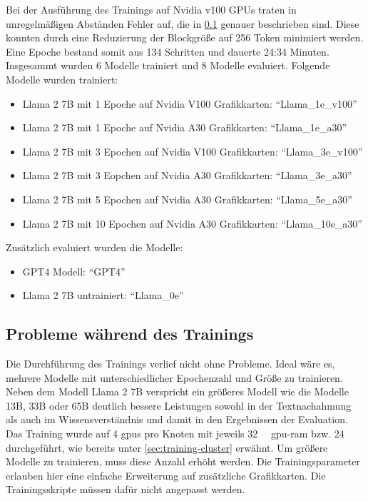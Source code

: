 Bei der Ausführung des Trainings auf Nvidia v100 GPUs traten in unregelmäßigen Abständen Fehler auf, die in \cref{sec:problem-training} genauer beschrieben sind.
Diese konnten durch eine Reduzierung der Blockgröße auf 256 Token minimiert werden. Eine Epoche bestand somit aus 134 Schritten und dauerte 24:34 Minuten.\\

Insgesammt wurden 6 Modelle trainiert und 8 Modelle evaluiert.
Folgende Modelle wurden trainiert:
\begin{itemize}
    \item Llama 2 7B mit 1 Epoche auf Nvidia V100 Grafikkarten: \enquote{Llama\_1e\_v100}
    \item Llama 2 7B mit 1 Epoche auf Nvidia A30 Grafikkarten: \enquote{Llama\_1e\_a30}
    \item Llama 2 7B mit 3 Epochen auf Nvidia V100 Grafikkarten: \enquote{Llama\_3e\_v100}
    \item Llama 2 7B mit 3 Eopchen auf Nvidia A30 Grafikkarten: \enquote{Llama\_3e\_a30}
    \item Llama 2 7B mit 5 Epochen auf Nvidia A30 Grafikkarten: \enquote{Llama\_5e\_a30}
    \item Llama 2 7B mit 10 Epochen auf Nvidia A30 Grafikkarten: \enquote{Llama\_10e\_a30}
\end{itemize}

Zusätzlich evaluiert wurden die Modelle:
\begin{itemize}
    \item GPT4 Modell: \enquote{GPT4}
    \item Llama 2 7B untrainiert: \enquote{Llama\_0e}
\end{itemize}

\subsection{Probleme während des Trainings}\label{sec:problem-training}
Die Durchführung des Trainings verlief nicht ohne Probleme.
Ideal wäre es, mehrere Modelle mit unterschiedlicher Epochenzahl und Größe zu trainieren.
Neben dem Modell Llama 2 7B verspricht ein größeres Modell wie die Modelle 13B, 33B oder 65B deutlich bessere Leistungen sowohl in der Textnachahmung als auch im Wissensverständnis und damit in den Ergebnissen der Evaluation.
Das Training wurde auf 4 \ac{gpu}s pro Knoten mit jeweils \SI{32}{\giga\byte} \ac{gpu}-\ac{ram} bzw. \SI{24}{\giga\byte} durchgeführt, wie bereits unter \cref{sec:training-cluster} erwähnt.
Um größere Modelle zu trainieren, muss diese Anzahl erhöht werden.
Die Trainingsparameter erlauben hier eine einfache Erweiterung auf zusätzliche Grafikkarten.
Die Trainingsskripte müssen dafür nicht angepasst werden.\\

